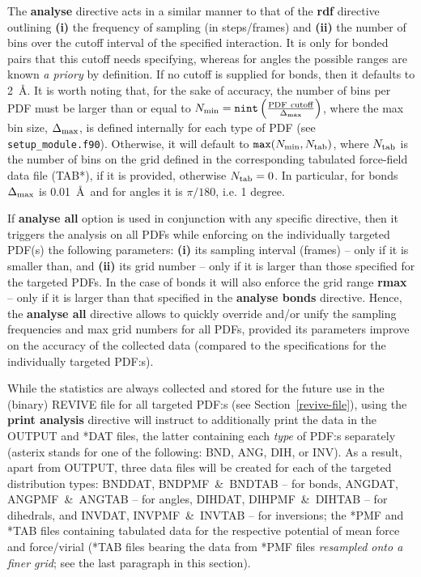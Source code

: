 The {\bf analyse} directive acts in a similar manner to that 
of the {\bf rdf} directive outlining {\bf (i)} the frequency 
of sampling (in steps/frames) and {\bf (ii)} the number of 
bins over the cutoff interval of the specified interaction. 
It is only for bonded pairs that this cutoff needs specifying, 
whereas for angles the possible ranges are known {\em a priory} 
by definition. If no cutoff is supplied for bonds, then it 
defaults to 2~\AA. It is worth noting that, for the sake of 
accuracy, the number of bins per PDF must be larger than or equal 
to $N_{\rm min} = {\tt nint} \left( \frac{\rm PDF~cutoff}{\Delta_{\rm max}} \right)$,
where the max bin size, $\Delta_{\rm max}$, is defined internally 
for each type of PDF (see {\tt setup\_module.f90}). Otherwise, 
it will default to ${\tt max}(N_{\rm min},N_{\rm tab})$, 
where $N_{\rm tab}$ is the number of bins on the grid defined 
in the corresponding tabulated force-field data file (TAB*),
if it is provided, otherwise $N_{\rm tab}=0$. 
In particular, for bonds $\Delta_{\rm max}$ is 0.01~\AA~and 
for angles it is $\pi/180$, i.e. 1 degree. 

If {\bf analyse all} option is used in conjunction with any specific 
directive, then it triggers the analysis on all PDFs while enforcing 
on the individually targeted PDF(s) the following parameters: {\bf (i)} 
its sampling interval (frames) -- only if it is smaller than, 
and {\bf (ii)} its grid number -- only if it is larger than 
those specified for the targeted PDFs. 
In the case of bonds it will also enforce the grid range {\bf rmax} --
only if it is larger than that specified in the {\bf analyse bonds} 
directive. Hence, the {\bf analyse all} directive allows to 
quickly override and/or unify the sampling frequencies and 
max grid numbers for all PDFs, provided its parameters improve 
on the accuracy of the collected data (compared to the specifications 
for the individually targeted PDF:s).

While the statistics are always collected and stored for the 
future use in the (binary) REVIVE file for all targeted PDF:s 
(see Section~\ref{revive-file}), using the {\bf print analysis} 
directive will instruct \D to additionally print the data in 
the OUTPUT and *DAT files, the latter containing each {\it type} 
of PDF:s separately (asterix stands for one of the following: BND, 
ANG, DIH, or INV). As a result, apart from OUTPUT, three data files 
will be created for each of the targeted distribution types: 
BNDDAT, BNDPMF~\&~BNDTAB -- for bonds, ANGDAT, ANGPMF~\&~ANGTAB 
-- for angles, DIHDAT, DIHPMF~\&~DIHTAB -- for dihedrals, and INVDAT, 
INVPMF~\&~INVTAB -- for inversions; the *PMF and *TAB files containing 
tabulated data for the respective potential of mean force and 
force/virial (*TAB files bearing the data from *PMF files 
{\em resampled onto a finer grid}; see the last paragraph 
in this section).

